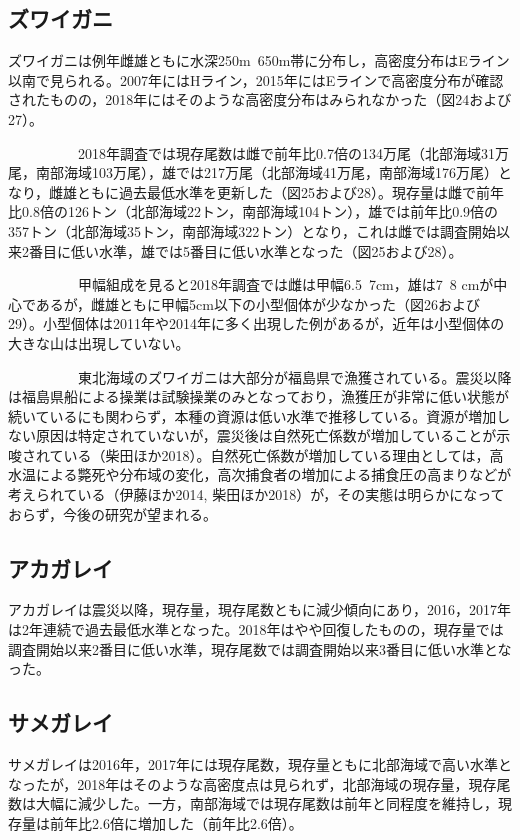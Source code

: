 \documentclass[11pt]{article} %
\begin{document}
\begin{linenumbers}
\subsection{ズワイガニ}
ズワイガニは例年雌雄ともに水深250m~650m帯に分布し，高密度分布はEライン以南で見られる。2007年にはHライン，2015年にはEラインで高密度分布が確認されたものの，2018年にはそのような高密度分布はみられなかった（図24および27）。

\ \ \ \ \ \ \ \ \ \ 
2018年調査では現存尾数は雌で前年比0.7倍の134万尾（北部海域31万尾，南部海域103万尾），雄では217万尾（北部海域41万尾，南部海域176万尾）となり，雌雄ともに過去最低水準を更新した（図25および28）。現存量は雌で前年比0.8倍の126トン（北部海域22トン，南部海域104トン），雄では前年比0.9倍の357トン（北部海域35トン，南部海域322トン）となり，これは雌では調査開始以来2番目に低い水準，雄では5番目に低い水準となった（図25および28）。

\ \ \ \ \ \ \ \ \ \ 
甲幅組成を見ると2018年調査では雌は甲幅6.5~7cm，雄は7~8 cmが中心であるが，雌雄ともに甲幅5cm以下の小型個体が少なかった（図26および29）。小型個体は2011年や2014年に多く出現した例があるが，近年は小型個体の大きな山は出現していない。

\ \ \ \ \ \ \ \ \ \ 
東北海域のズワイガニは大部分が福島県で漁獲されている。震災以降は福島県船による操業は試験操業のみとなっており，漁獲圧が非常に低い状態が続いているにも関わらず，本種の資源は低い水準で推移している。資源が増加しない原因は特定されていないが，震災後は自然死亡係数が増加していることが示唆されている（柴田ほか2018）。自然死亡係数が増加している理由としては，高水温による斃死や分布域の変化，高次捕食者の増加による捕食圧の高まりなどが考えられている（伊藤ほか2014, 柴田ほか2018）が，その実態は明らかになっておらず，今後の研究が望まれる。

\subsection{アカガレイ}
アカガレイは震災以降，現存量，現存尾数ともに減少傾向にあり，2016，2017年は2年連続で過去最低水準となった。2018年はやや回復したものの，現存量では調査開始以来2番目に低い水準，現存尾数では調査開始以来3番目に低い水準となった。

\subsection{サメガレイ}
サメガレイは2016年，2017年には現存尾数，現存量ともに北部海域で高い水準となったが，2018年はそのような高密度点は見られず，北部海域の現存量，現存尾数は大幅に減少した。一方，南部海域では現存尾数は前年と同程度を維持し，現存量は前年比2.6倍に増加した（前年比2.6倍）。


\end{linenumbers}
\end{document}
